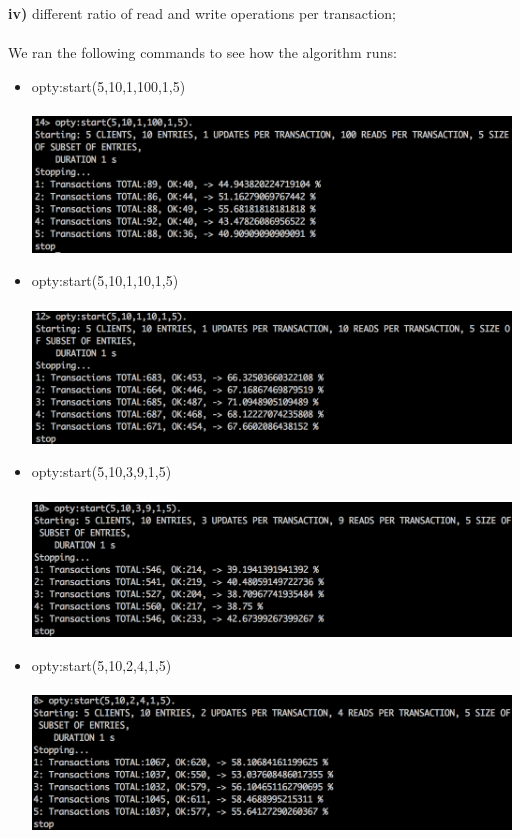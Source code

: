 \documentclass[a4paper, 11pt]{article}
\begin{document}
\textbf{iv)} different ratio of read and write operations per transaction;\\\\
We ran the following commands to see how the algorithm runs:\\
\begin{itemize}
\item opty:start(5,10,1,100,1,5)\\\\
\includegraphics[scale=0.5]{images/exp-iv-7.png} \\
\item opty:start(5,10,1,10,1,5)\\\\
\includegraphics[scale=0.5]{images/exp-iv-5.png} \\
\item opty:start(5,10,3,9,1,5)\\\\
\includegraphics[scale=0.5]{images/exp-iv-3.png} \\
\item opty:start(5,10,2,4,1,5)\\\\
\includegraphics[scale=0.5]{images/exp-iv-1.png} \\

\end{itemize}
\end{document}

